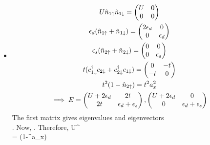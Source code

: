 \documentclass[12pt]{article}
\begin{document}
\subsection{}
\begin{itemize}
    \item {}
	\begin{gather}
	    U\hat n_{1\uparrow}\hat n_{1\downarrow}=\begin{pmatrix}U& 0 \\ 0 & 0 \end{pmatrix}\\
	    \epsilon_d(\hat n_{1\uparrow}+\hat n_{1\downarrow})=\begin{pmatrix}2\epsilon_d & 0 \\ 0 & \epsilon_d \end{pmatrix}\\
	\epsilon_s(\hat n_{2\uparrow}+\hat n_{2\downarrow})=\begin{pmatrix}0 & 0 \\ 0 & \epsilon_s \end{pmatrix}\\
	t(c_{1\downarrow}^\dagger c_{2\downarrow}+c_{2\downarrow}^\dagger c_{1\downarrow})=\begin{pmatrix}0 & -t \\ -t & 0 \end{pmatrix}\\
	    t^2(1-\hat n_{2\uparrow})=t^2 a_x^2\\
	\implies E= \begin{pmatrix}U+2\epsilon_d & 2t \\ 2t & \epsilon_d + \epsilon_s \end{pmatrix}, \begin{pmatrix}U+2\epsilon_d & 0 \\ 0 & \epsilon_d + \epsilon_s \end{pmatrix}
	\end{gather}
	The first matrix gives eigenvalues  and eigenvectors \\. Now, . Therefore,
	\beq
	U^\dagger{} \\
	= (1-\cd^\dagger\ca\hat a_x)\\

\end{itemize}
\end{document}

